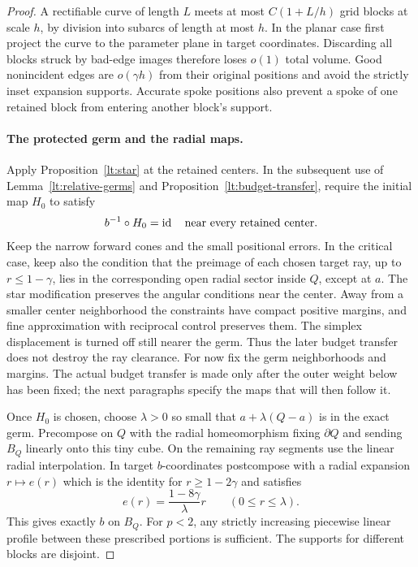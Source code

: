 \begin{proof}
A rectifiable curve of length $L$ meets at most $C(1+L/h)$ grid blocks
at scale $h$, by division into subarcs of length at most $h$.  In the
planar case first project the curve to the parameter plane in target
coordinates.  Discarding all blocks struck by bad-edge images
therefore loses $o(1)$ total volume.  Good nonincident edges are
$o(\gamma h)$ from their original positions and avoid the strictly
inset expansion supports.  Accurate spoke positions also prevent a
spoke of one retained block from entering another block's support.

\paragraph{The protected germ and the radial maps.}
Apply Proposition~\ref{lt:star} at the retained centers.  In the
subsequent use of Lemma~\ref{lt:relative-germs} and
Proposition~\ref{lt:budget-transfer}, require the initial map $H_0$
to satisfy
\[
 b^{-1}\circ H_0=\operatorname{id}\quad\hbox{near every retained center}.
\]
Keep the narrow forward cones and the small positional errors.  In
the critical case, keep also the condition that the preimage of each
chosen target ray, up to $r\le1-\gamma$, lies in the corresponding
open radial sector inside $Q$, except at $a$.  The star modification
preserves the angular conditions near the center.  Away from a
smaller center neighborhood the constraints have compact positive
margins, and fine approximation with reciprocal control preserves
them.  The simplex displacement is turned off still nearer the
germ.  Thus the later budget transfer does not destroy the ray
clearance.  For now fix the germ neighborhoods and margins.  The
actual budget transfer is made only after the outer weight below
has been fixed; the next paragraphs specify the maps that will
then follow it.

Once $H_0$ is chosen, choose $\lambda>0$ so small that $a+\lambda(Q-a)$ is in the exact
germ.  Precompose on $Q$ with the radial homeomorphism fixing
$\partial Q$ and sending $B_Q$ linearly onto this tiny cube.  On the
remaining ray segments use the linear radial interpolation.  In
target $b$-coordinates postcompose with a radial expansion $r\mapsto
e(r)$ which is the identity for $r\ge1-2\gamma$ and satisfies
\[
 e(r)=\frac{1-8\gamma}{\lambda}r\qquad(0\le r\le\lambda).
\]
This gives exactly $b$ on $B_Q$.  For $p<2$, any strictly increasing
piecewise linear profile between these prescribed portions is
sufficient.  The supports for different blocks are disjoint.


\end{proof}
